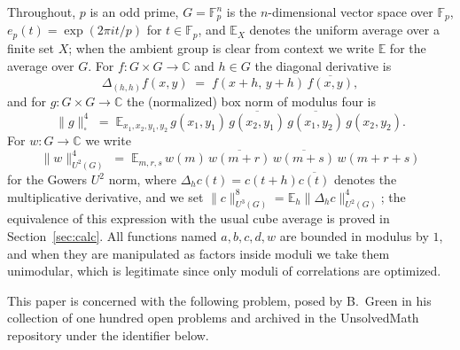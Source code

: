 \documentclass[11pt]{article}
\theoremstyle{remark}
\begin{document}
Throughout, $p$ is an odd prime, $G=\mathbb{F}_p^n$ is the $n$-dimensional
vector space over $\mathbb{F}_p$, $e_p(t)=\exp(2\pi i t/p)$ for
$t\in\mathbb{F}_p$, and $\mathbb{E}_X$ denotes the uniform average over a
finite set $X$; when the ambient group is clear from context we write
$\mathbb{E}$ for the average over $G$. For $f:G\times G\to\mathbb{C}$ and
$h\in G$ the diagonal derivative is
\begin{equation}\label{eq:diagderiv}
\Delta_{(h,h)}f(x,y) \;=\; f(x+h,\,y+h)\,\overline{f(x,y)},
\end{equation}
and for $g:G\times G\to\mathbb{C}$ the (normalized) box norm of modulus four
is
\begin{equation}\label{eq:boxnorm}
\|g\|_{\square}^4 \;=\;
\mathbb{E}_{x_1,x_2,y_1,y_2}\,
g(x_1,y_1)\,\overline{g(x_2,y_1)}\,\overline{g(x_1,y_2)}\,g(x_2,y_2).
\end{equation}
For $w:G\to\mathbb{C}$ we write
\begin{equation}\label{eq:u2}
\|w\|_{U^2(G)}^4 \;=\;
\mathbb{E}_{m,r,s}\,
w(m)\,\overline{w(m+r)}\,\overline{w(m+s)}\,w(m+r+s)
\end{equation}
for the Gowers $U^2$ norm, where $\Delta_hc(t)=c(t+h)\overline{c(t)}$ denotes
the multiplicative derivative, and we set
$\|c\|_{U^3(G)}^8=\mathbb{E}_{h}\|\Delta_h c\|_{U^2(G)}^4$; the equivalence of
this expression with the usual cube average is proved in
Section~\ref{sec:calc}. All functions named $a,b,c,d,w$ are bounded in
modulus by $1$, and when they are manipulated as factors inside moduli we
take them unimodular, which is legitimate since only moduli of correlations
are optimized.

This paper is concerned with the following problem, posed by B.~Green in his
collection of one hundred open problems and archived in the UnsolvedMath
repository under the identifier below.
\end{document}
